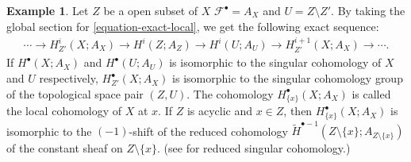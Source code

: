 \documentclass[a4paper,dvipdfmx,reqno,12pt]{amsart}
\theoremstyle{definition}
\newtheorem{example}[theorem]{Example}
\numberwithin{equation}{section}
\begin{document}
\begin{example}
\label{example-local-cohomology}
Let $Z$ be a open subset of $X$ 
$\mathcal{F}^{\bullet}=A_{X}$ 
and $U=Z\setminus Z'$.
By taking the global 
section for \cref{equation-exact-local}, we get 
the following exact sequence:
\begin{align}
  \cdots \to H^{i}_{Z'}(X;A_X)\to
H^{i}(Z;A_{Z})\to H^{i}(U;A_U)\to 
H^{i+1}_{Z'}(X;A_X) \to \cdots.
\end{align}
If $H^{\bullet}(X;A_X)$ and $H^{\bullet}(U;A_U)$ 
is isomorphic to the singular cohomology of $X$ and $U$
respectively, $H^{\bullet}_{Z'}(X;A_X)$ is isomorphic to
the singular cohomology group of the topological space 
pair $(Z,U)$.
The cohomology $H^{\bullet}_{\{x\}}(X;A_X)$ is called
the local cohomology of $X$ at $x$.
If $Z$ is acyclic and $x\in Z$, then $H^{\bullet}_{\{x\}}(X;A_X)$ is 
isomorphic to the $(-1)$-shift of the reduced cohomology 
$\tilde{H}^{\bullet-1}(Z\setminus \{x\};
A_{Z\setminus \{x\}})$
of the constant sheaf on $Z\setminus \{x\}$.
(see 
\cite[p.199]{hatcherAlgebraicTopology2002a} for 
reduced singular cohomology.)
\end{example}
\end{document}
